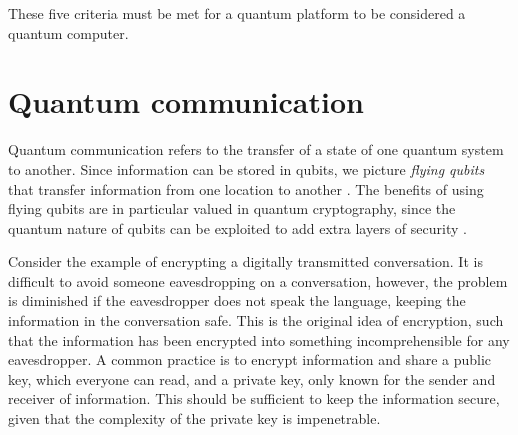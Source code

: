 \noindent These five criteria must be met for a quantum platform to be considered a quantum computer.




\section{Quantum communication}

Quantum communication refers to the transfer of a state of one quantum system to another. Since information can be stored in qubits, we picture \textit{flying qubits} that transfer information from one location to another \cite{Griffiths2002}. The benefits of using flying qubits are in particular valued in quantum cryptography, since the quantum nature of qubits can be exploited to add extra layers of security \cite{Pavicic2006}.



Consider the example of encrypting a digitally transmitted conversation. It is difficult to avoid someone eavesdropping on a conversation, however, the problem is diminished if the eavesdropper does not speak the language, keeping the information in the conversation safe. This is the original idea of encryption, such that the information has been encrypted into something incomprehensible for any eavesdropper. A common practice is to encrypt information and share a public key, which everyone can read, and a private key, only known for the sender and receiver of information. This should be sufficient to keep the information secure, given that the complexity of the private key is impenetrable.

